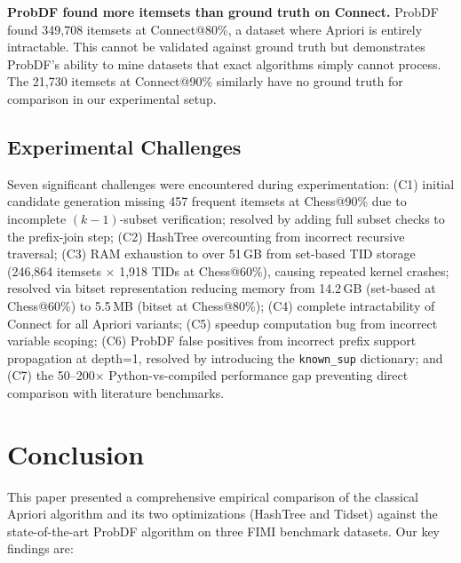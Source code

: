 \documentclass[conference]{IEEEtran}
\begin{document}
\textbf{ProbDF found more itemsets than ground truth on Connect.}
ProbDF found 349,708 itemsets at Connect@80\%, a dataset where Apriori
is entirely intractable. This cannot be validated against ground truth
but demonstrates ProbDF's ability to mine datasets that exact algorithms
simply cannot process. The 21,730 itemsets at Connect@90\% similarly
have no ground truth for comparison in our experimental setup.

\subsection{Experimental Challenges}

Seven significant challenges were encountered during experimentation:
(C1) initial candidate generation missing 457 frequent itemsets at
Chess@90\% due to incomplete $(k-1)$-subset verification; resolved by
adding full subset checks to the prefix-join step;
(C2) HashTree overcounting from incorrect recursive traversal;
(C3) RAM exhaustion to over 51\,GB from set-based TID storage (246,864
itemsets $\times$ 1,918 TIDs at Chess@60\%), causing repeated kernel
crashes; resolved via bitset representation reducing memory from 14.2\,GB
(set-based at Chess@60\%) to 5.5\,MB (bitset at Chess@80\%);
(C4) complete intractability of Connect for all Apriori variants;
(C5) speedup computation bug from incorrect variable scoping;
(C6) ProbDF false positives from incorrect prefix support propagation
at depth=1, resolved by introducing the \texttt{known\_sup} dictionary;
and (C7) the 50--200$\times$ Python-vs-compiled performance gap
preventing direct comparison with literature benchmarks.

\section{Conclusion}

This paper presented a comprehensive empirical comparison of the classical
Apriori algorithm and its two optimizations (HashTree and Tidset) against
the state-of-the-art ProbDF algorithm \cite{probdf2024} on three FIMI
benchmark datasets. Our key findings are:
\end{document}
